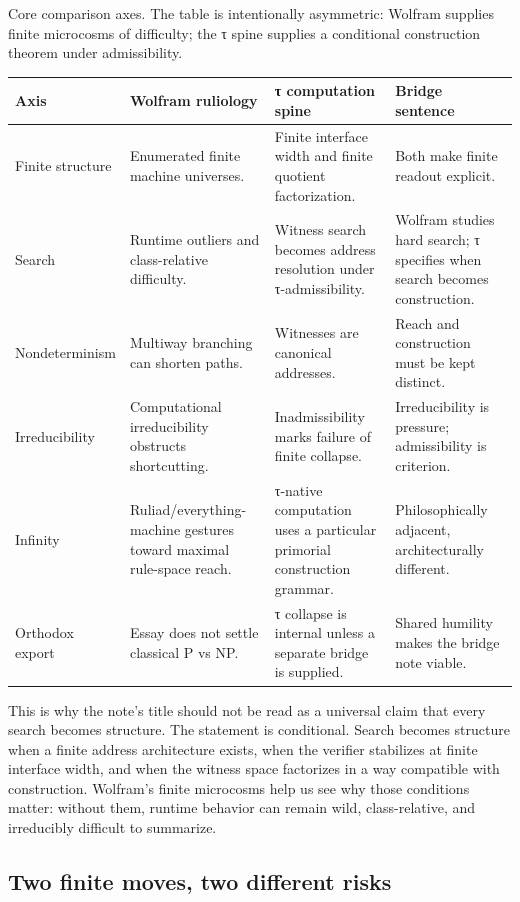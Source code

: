 \documentclass{pantarhei-researchnote}
\begin{document}
\begin{widetable}[t]
\caption{Core comparison axes. The table is intentionally asymmetric:
Wolfram supplies finite microcosms of difficulty; the τ spine supplies a
conditional construction theorem under admissibility.}
\label{tab:comparison}
\prtablefont
\begin{tabularx}{\textwidth}{p{}Y Y Y}
\toprule
\textbf{Axis} & \textbf{Wolfram ruliology} & \textbf{τ computation spine} & \textbf{Bridge sentence} \\
\midrule
Finite structure & Enumerated finite machine universes. & Finite interface width and finite quotient factorization. & Both make finite readout explicit. \\
Search & Runtime outliers and class-relative difficulty. & Witness search becomes address resolution under τ-admissibility. & Wolfram studies hard search; τ specifies when search becomes construction. \\
Nondeterminism & Multiway branching can shorten paths. & Witnesses are canonical addresses. & Reach and construction must be kept distinct. \\
Irreducibility & Computational irreducibility obstructs shortcutting. & Inadmissibility marks failure of finite collapse. & Irreducibility is pressure; admissibility is criterion. \\
Infinity & Ruliad/everything-machine gestures toward maximal rule-space reach. & τ-native computation uses a particular primorial construction grammar. & Philosophically adjacent, architecturally different. \\
Orthodox export & Essay does not settle classical P vs NP. & τ collapse is internal unless a separate bridge is supplied. & Shared humility makes the bridge note viable. \\
\bottomrule
\end{tabularx}
\end{widetable}

This is why the note's title should not be read as a universal claim that
every search becomes structure. The statement is conditional. Search
becomes structure when a finite address architecture exists, when the
verifier stabilizes at finite interface width, and when the witness space
factorizes in a way compatible with construction. Wolfram's finite
microcosms help us see why those conditions matter: without them, runtime
behavior can remain wild, class-relative, and irreducibly difficult to
summarize.

\subsection{Two finite moves, two different risks}
\end{document}
